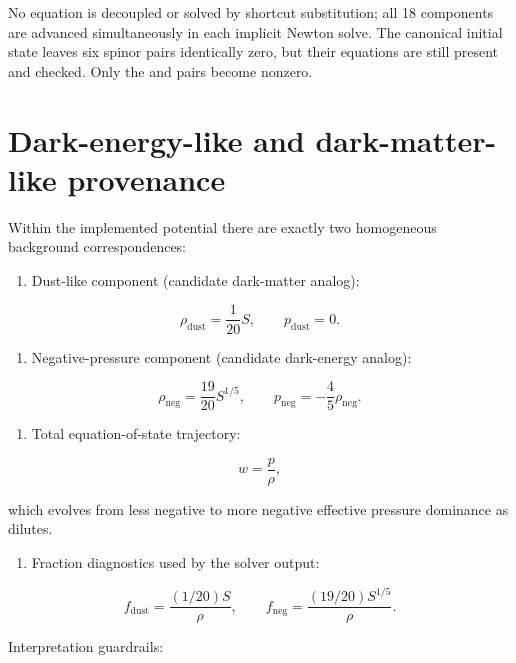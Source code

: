 \documentclass[11pt]{article}
\begin{document}
No equation is decoupled or solved by shortcut substitution; all 18 components are advanced simultaneously in each implicit Newton solve. The canonical initial state leaves six spinor pairs identically zero, but their equations are still present and checked. Only the \texttt{} and \texttt{} pairs become nonzero.

\section{Dark-energy-like and dark-matter-like provenance}

Within the implemented potential there are exactly two homogeneous background correspondences:

\begin{enumerate}
\item Dust-like component (candidate dark-matter analog):
\end{enumerate}

\[
\rho_{\mathrm{dust}}=\frac{1}{20}S,
\qquad p_{\mathrm{dust}}=0.
\]

\begin{enumerate}
\item Negative-pressure component (candidate dark-energy analog):
\end{enumerate}

\[
\rho_{\mathrm{neg}}=\frac{19}{20}S^{1/5},
\qquad p_{\mathrm{neg}}=-\frac{4}{5}\rho_{\mathrm{neg}}.
\]

\begin{enumerate}
\item Total equation-of-state trajectory:
\end{enumerate}

\[
w=\frac{p}{\rho},
\]

which evolves from less negative to more negative effective pressure dominance as \texttt{} dilutes.

\begin{enumerate}
\item Fraction diagnostics used by the solver output:
\end{enumerate}

\[
f_{\mathrm{dust}}=\frac{(1/20)S}{\rho},
\qquad
f_{\mathrm{neg}}=\frac{(19/20)S^{1/5}}{\rho}.
\]

Interpretation guardrails:
\end{document}

